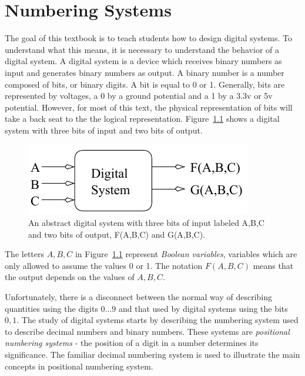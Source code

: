 \chapter{Numbering Systems}
\label{chapter:NumberingSystems}
\graphicspath{ {./chapter01/Fig} }

The goal of this textbook is to teach students how to design digital systems.
To understand what this means, it is necessary to understand the behavior of
a digital system.  A digital system is a device which receives binary
numbers as input and generates binary numbers as output.  A binary number
is a number composed of bits, or binary digits.  A bit is equal to
0 or 1.  Generally, bits are represented by voltages, a 0 by a ground
potential and a 1 by a 3.3v or 5v potential.  However, for most of this
text, the physical representation of bits will take a back seat to the
the logical representation.  Figure~\ref{fig:numberingSys} shows
a digital system with three bits of input and two bits of output.

\begin{figure}[ht]
    \includegraphics{sys}
    \caption{An abstract digital system with three bits of input
    labeled A,B,C and two bits of output, F(A,B,C) and G(A,B,C).}
    \label{fig:numberingSys}
\end{figure}

The letters $A,B,C$ in Figure~\ref{fig:numberingSys} represent \textit{ Boolean variables},
 variables which are only allowed to assume the values
0 or 1.  The notation $F(A,B,C)$ means that the output depends on the values
of $A,B,C$.

Unfortunately, there is a disconnect between the normal way of describing
quantities using the digits $0 \ldots 9$ and that used by digital systems
using the bits $0,1$.  The study of digital systems starts by describing
the numbering system used to describe decimal numbers and binary numbers.
These systems are
\textit{ positional numbering systems} 
- the position of a digit in a number determines its significance.  The
familiar decimal numbering system is used to illustrate the main concepts
in positional numbering system.

